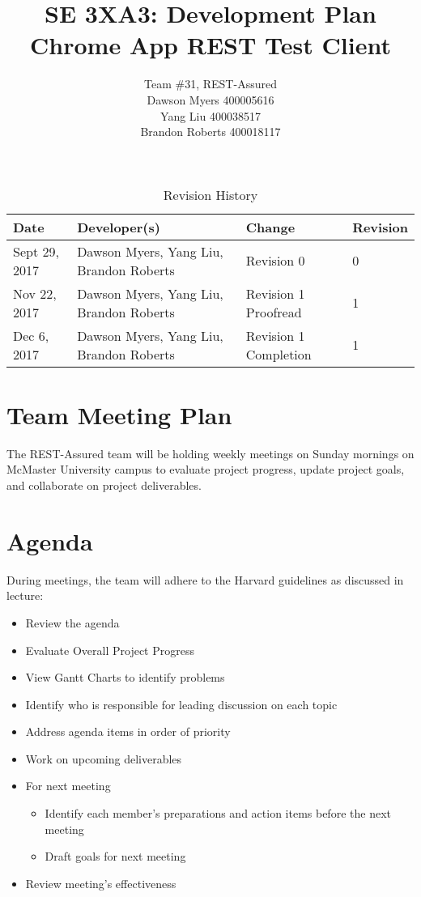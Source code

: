 \documentclass{article}
\title{SE 3XA3: Development Plan\\Chrome App REST Test Client}
\author{Team \#31, REST-Assured
		\\ Dawson Myers 400005616
		\\ Yang Liu 400038517
		\\ Brandon Roberts 400018117
}
\date{}
\begin{document}
\begin{table}[hp]
\caption{Revision History} \label{TblRevisionHistory}
\begin{tabularx}{\textwidth}{lXlX}
\toprule
\textbf{Date} & \textbf{Developer(s)} & \textbf{Change} & \textbf{Revision}\\
\midrule
Sept​ ​29,​ ​2017 & Dawson Myers, Yang Liu, Brandon Roberts & Revision​ ​0 & 0\\
\hline
Nov​ ​22,​ ​2017 & Dawson Myers, Yang Liu, Brandon Roberts & Revision​ ​1 Proofread & 1\\
\hline
Dec 6,​ ​2017 & Dawson Myers, Yang Liu, Brandon Roberts & Revision​ ​1 Completion & 1\\
\hline
\bottomrule
\end{tabularx}
\end{table}

\newpage

\maketitle


\section{Team Meeting Plan}
The REST-Assured team will be holding weekly meetings on Sunday mornings on McMaster University campus to evaluate project progress, update project goals, and collaborate on project deliverables. 

\section{Agenda}
During meetings, the team will adhere to the Harvard guidelines as discussed in lecture:
\begin{itemize}
\item Review the agenda
\item Evaluate Overall Project Progress
\item View Gantt Charts to identify problems
\item Identify who is responsible for leading discussion on each topic
\item Address agenda items in order of priority 
\item Work on upcoming deliverables
\item For next meeting
\begin{itemize}
\item Identify each member’s preparations and action items before the next meeting
\item Draft goals for next meeting
\end{itemize}
\item Review meeting’s effectiveness
\end{itemize}
\end{document}
